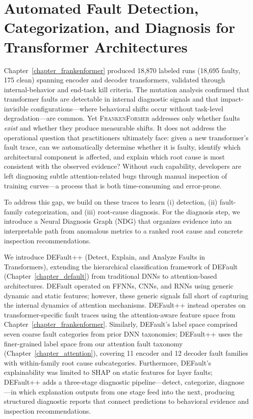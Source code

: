 \chapter{Automated Fault Detection, Categorization, and Diagnosis for Transformer Architectures}
\label{chapter_defaultpp}

Chapter~\ref{chapter_frankenformer} produced 18{,}870 labeled runs (18{,}695 faulty, 175 clean) spanning encoder and decoder transformers, validated through internal-behavior and end-task kill criteria. The mutation analysis confirmed that transformer faults are detectable in internal diagnostic signals and that impact-invisible configurations---where behavioral shifts occur without task-level degradation---are common. Yet \textsc{FrankenFormer} addresses only whether faults \emph{exist} and whether they produce measurable shifts. It does not address the operational question that practitioners ultimately face: given a new transformer's fault trace, can we automatically determine whether it is faulty, identify which architectural component is affected, and explain which root cause is most consistent with the observed evidence? Without such capability, developers are left diagnosing subtle attention-related bugs through manual inspection of training curves---a process that is both time-consuming and error-prone.

To address this gap, we build on these traces to learn (i) detection, (ii) fault-family categorization, and (iii) root-cause diagnosis. For the diagnosis step, we introduce a Neural Diagnosis Graph (NDG) that organizes evidence into an interpretable path from anomalous metrics to a ranked root cause and concrete inspection recommendations.

We introduce DEFault++ (Detect, Explain, and Analyze Faults in Transformers), extending the hierarchical classification framework of DEFault (Chapter~\ref{chapter_default}) from traditional DNNs to attention-based architectures. DEFault operated on FFNNs, CNNs, and RNNs using generic dynamic and static features; however, these generic signals fall short of capturing the internal dynamics of attention mechanisms. DEFault++ instead operates on transformer-specific fault traces using the attention-aware feature space from Chapter~\ref{chapter_frankenformer}. Similarly, DEFault's label space comprised seven coarse fault categories from prior DNN taxonomies; DEFault++ uses the finer-grained label space from our attention fault taxonomy (Chapter~\ref{chapter_attention}), covering 11 encoder and 12 decoder fault families with within-family root cause subcategories. Furthermore, DEFault's explainability was limited to SHAP on static features for layer faults; DEFault++ adds a three-stage diagnostic pipeline---detect, categorize, diagnose---in which explanation outputs from one stage feed into the next, producing structured diagnostic reports that connect predictions to behavioral evidence and inspection recommendations.

